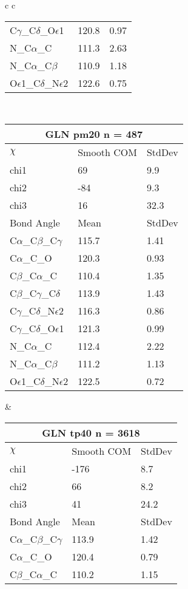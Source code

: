 \begin{longtable}{ c c }
\begin{tabular}{ l l l }
  C$\gamma$\_C$\delta$\_O$\epsilon$1 & 120.8 & 0.97\\
  N\_C$\alpha$\_C & 111.3 & 2.63\\
  N\_C$\alpha$\_C$\beta$ & 110.9 & 1.18\\
  O$\epsilon$1\_C$\delta$\_N$\epsilon$2 & 122.6 & 0.75\\
  \bottomrule
  \end{tabular}
  \\
  \begin{tabular}{ l l l }
  \toprule
  \multicolumn{3}{c}{GLN \textbf{pm20} n = 487} \\ \toprule
  $\chi$       & Smooth COM & StdDev \\ \midrule
  chi1 & 69 & 9.9 \\ 
  chi2 & -84 & 9.3 \\ 
  chi3 & 16 & 32.3 \\ \midrule
  Bond Angle   & Mean     & StdDev \\ \midrule
  C$\alpha$\_C$\beta$\_C$\gamma$ & 115.7 & 1.41\\
  C$\alpha$\_C\_O & 120.3 & 0.93\\
  C$\beta$\_C$\alpha$\_C & 110.4 & 1.35\\
  C$\beta$\_C$\gamma$\_C$\delta$ & 113.9 & 1.43\\
  C$\gamma$\_C$\delta$\_N$\epsilon$2 & 116.3 & 0.86\\
  C$\gamma$\_C$\delta$\_O$\epsilon$1 & 121.3 & 0.99\\
  N\_C$\alpha$\_C & 112.4 & 2.22\\
  N\_C$\alpha$\_C$\beta$ & 111.2 & 1.13\\
  O$\epsilon$1\_C$\delta$\_N$\epsilon$2 & 122.5 & 0.72\\
  \bottomrule
  \end{tabular}
  &
  \begin{tabular}{ l l l }
  \toprule
  \multicolumn{3}{c}{GLN \textbf{tp40} n = 3618} \\ \toprule
  $\chi$       & Smooth COM & StdDev \\ \midrule
  chi1 & -176 & 8.7 \\ 
  chi2 & 66 & 8.2 \\ 
  chi3 & 41 & 24.2 \\ \midrule
  Bond Angle   & Mean     & StdDev \\ \midrule
  C$\alpha$\_C$\beta$\_C$\gamma$ & 113.9 & 1.42\\
  C$\alpha$\_C\_O & 120.4 & 0.79\\
  C$\beta$\_C$\alpha$\_C & 110.2 & 1.15\\

\end{tabular}
\end{longtable}
